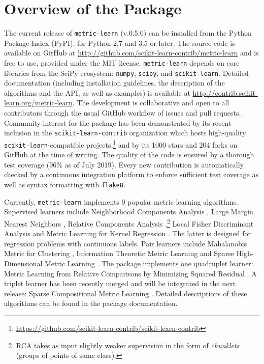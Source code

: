 \documentclass[twoside,11pt]{article}
\newcommand{\aurelien}[1]{\todo[inline,caption={},color=orange!40]{{\it Aurelien:~}#1}}
\begin{document}
\section{Overview of the Package}

The current release of \texttt{metric-learn} (v.0.5.0) can be installed from the Python Package Index (PyPI), for Python 2.7 and 3.5 or later. 
The source code is available on GitHub at \url{http://github.com/scikit-learn-contrib/metric-learn} and is free to use, provided under the MIT license. 
\texttt{metric-learn} depends on core libraries from the SciPy ecosystem: \texttt{numpy}, \texttt{scipy}, and \texttt{scikit-learn}.
Detailed documentation (including installation guidelines, the description of the algorithms and the API, as well as examples) is available at \url{http://contrib.scikit-learn.org/metric-learn}.
The development is collaborative and open to all contributors through the usual GitHub workflow of issues and pull requests.
Community interest for the package has been demonstrated by its recent inclusion in the \texttt{scikit-learn-contrib} organization which hosts high-quality \texttt{scikit-learn}-compatible projects,\footnote{\url{https://github.com/scikit-learn-contrib/scikit-learn-contrib}} and by its 1000 stars and 204 forks on GitHub at the time of writing.
The quality of the code is ensured by a thorough test coverage (96\% as of July 2019).
Every new contribution is automatically checked by a continuous integration platform to enforce sufficient test coverage as well as syntax formatting with \texttt{flake8}. %

Currently, \texttt{metric-learn} implements 9 popular metric learning algorithms.
Supervised learners include Neighborhood Components Analysis \citep[NCA,][]{Goldberger04}, Large Margin Nearest Neighbors \citep[LMNN,][]{Weinberger09}, Relative Components Analysis \citep[RCA,][]{Shental02},\footnote{RCA takes as input slightly weaker supervision in the form of \emph{chunklets} (groups of points of same class).} Local Fisher Discriminant Analysis \citep[LFDA,][]{Sugiyama07} and Metric Learning for Kernel Regression \citep[MLKR,][]{Weinberger07}.
The latter is designed for regression problems with continuous labels.
Pair learners include Mahalanobis Metric for Clustering \citep[MMC,][]{Xing2002a}, Information Theoretic Metric Learning \citep[ITML,][]{Davis07} and Sparse High-Dimensional Metric Learning \citep[SDML,][]{Qi09}.
The package implements one quadruplet learner: Metric Learning from Relative Comparisons by Minimizing Squared Residual \citep[LSML,][]{Liu12}. A triplet learner has been recently merged and will be integrated in the next release: Sparse Compositional Metric Learning \citep[SCML,][]{Shi15}.
Detailed descriptions of these algorithms can be found in the package documentation.
\end{document}
